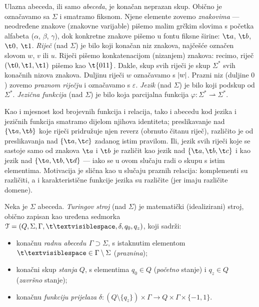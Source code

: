 Ulazna abeceda, ili samo \emph{abeceda}, je konačan neprazan skup. Obično je označavamo sa $\Sigma$ i smatramo fiksnom. Njene elemente zovemo \emph{znakovima} --- ne\-od\-re\-đe\-ne znakove (znakovne varijable) pišemo malim grčkim slovima s početka alfabeta ($\alpha$, $\beta$, $\gamma$), dok konkretne znakove pišemo u fontu fiksne širine: $\t a$, $\t b$, $\t 0$, $\t 1$. \emph{Riječ} (nad $\Sigma$) je bilo koji konačan niz znakova, najčešće označen slovom $w$, $v$ ili $u$. Riječi pišemo konkatenacijom (nizanjem) znakova: recimo, riječ $(\t0,\t1,\t1)$ pišemo kao $\t{011}$. Dakle, skup svih riječi je skup $\Sigma^*$ svih konačnih nizova znakova. Duljinu riječi $w$ označavamo s $\lvert w\rvert$. Prazni niz (duljine $0$) zovemo \emph{praznom riječju} i označavamo s $\varepsilon$. \emph{Jezik} (nad $\Sigma$) je bilo koji podskup od $\Sigma^*$. \emph{Jezična funkcija} (nad $\Sigma$) je bilo koja parcijalna funkcija $\varphi:\Sigma^*\rightharpoonup\Sigma^*$.

\begin{napomena}[{name=[abeceda je dio identiteta jezične funkcije]}]
Kao i mjesnost kod brojevnih funkcija i relacija, tako i abecedu kod jezika i jezičnih funkcija smatramo dijelom njihova identiteta; preslikavanje nad $\{\t a,\t b\}$ koje riječi pridružuje njen reverz (obrnuto čitanu riječ), različito je od preslikavanja nad $\{\t a,\t c\}$ zadanog istim pravilom. Ili, jezik svih riječi koje se sastoje samo od znakova $\t a$ i $\t b$ je različit kao jezik nad $\{\t a,\t b,\t c\}$ i kao jezik nad $\{\t a,\t b,\t d\}$ --- iako se u ovom slučaju radi o skupu s istim elementima. Motivacija je slična kao u slučaju praznih relacija: komplementi su različiti, a i karakteristične funkcije jezika su različite (jer imaju različite domene).
\end{napomena}

\begin{definicija}[{name=[Turingov stroj]}]
Neka je $\Sigma$ abeceda. \emph{Turingov stroj} (nad $\Sigma$) je matematički (idealizirani) stroj, obično zapisan kao uređena sedmorka $\mathcal T=(Q,\Sigma,\Gamma,\bl,\delta,q_0,q_z)$, koji sadrži:
\begin{itemize}
\item konačnu \emph{radnu abecedu} $\mspace{1mu}\Gamma\supset\Sigma$, s istaknutim elementom $\bl\in\Gamma\setminus\Sigma$ (\emph{praznina});
    \item konačni skup \emph{stanja} $Q$, s elementima $q_0\in Q$ (\emph{početno} stanje) i $q_z\in Q$ (\emph{završno} stanje);
    \item konačnu \emph{funkciju prijelaza} $\delta:(Q\setminus\{q_z\})\times\Gamma\to Q\times\Gamma\times\{-1,1\}$.\qedhere
\end{itemize}
\end{definicija}

